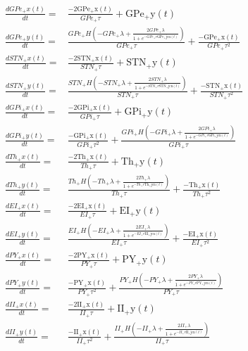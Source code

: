 \begin{align}
\frac{dGPe_{+}x(t)}{dt} =& \frac{ - 2 \mathrm{GPe_{+}x}\left( t \right)}{GPe_+\tau} + \mathrm{GPe_{+}y}\left( t \right) \\
\frac{dGPe_{+}y(t)}{dt} =& \frac{GPe_{+}H \left(  - GPe_+\lambda + \frac{2 GPe_+\lambda}{1 + e^{ - GPe_{+}r \mathrm{GPe_{+}jcn}\left( t \right)}} \right)}{GPe_+\tau} + \frac{ - \mathrm{GPe_{+}x}\left( t \right)}{GPe_+\tau^{2}} \\
\frac{dSTN_{+}x(t)}{dt} =& \frac{ - 2 \mathrm{STN_{+}x}\left( t \right)}{STN_+\tau} + \mathrm{STN_{+}y}\left( t \right) \\
\frac{dSTN_{+}y(t)}{dt} =& \frac{STN_{+}H \left(  - STN_+\lambda + \frac{2 STN_+\lambda}{1 + e^{ - STN_{+}r \mathrm{STN_{+}jcn}\left( t \right)}} \right)}{STN_+\tau} + \frac{ - \mathrm{STN_{+}x}\left( t \right)}{STN_+\tau^{2}} \\
\frac{dGPi_{+}x(t)}{dt} =& \frac{ - 2 \mathrm{GPi_{+}x}\left( t \right)}{GPi_+\tau} + \mathrm{GPi_{+}y}\left( t \right) \\
\frac{dGPi_{+}y(t)}{dt} =& \frac{ - \mathrm{GPi_{+}x}\left( t \right)}{GPi_+\tau^{2}} + \frac{GPi_{+}H \left(  - GPi_+\lambda + \frac{2 GPi_+\lambda}{1 + e^{ - GPi_{+}r \mathrm{GPi_{+}jcn}\left( t \right)}} \right)}{GPi_+\tau} \\
\frac{dTh_{+}x(t)}{dt} =& \frac{ - 2 \mathrm{Th_{+}x}\left( t \right)}{Th_+\tau} + \mathrm{Th_{+}y}\left( t \right) \\
\frac{dTh_{+}y(t)}{dt} =& \frac{Th_{+}H \left(  - Th_+\lambda + \frac{2 Th_+\lambda}{1 + e^{ - Th_{+}r \mathrm{Th_{+}jcn}\left( t \right)}} \right)}{Th_+\tau} + \frac{ - \mathrm{Th_{+}x}\left( t \right)}{Th_+\tau^{2}} \\
\frac{dEI_{+}x(t)}{dt} =& \frac{ - 2 \mathrm{EI_{+}x}\left( t \right)}{EI_+\tau} + \mathrm{EI_{+}y}\left( t \right) \\
\frac{dEI_{+}y(t)}{dt} =& \frac{EI_{+}H \left(  - EI_+\lambda + \frac{2 EI_+\lambda}{1 + e^{ - EI_{+}r \mathrm{EI_{+}jcn}\left( t \right)}} \right)}{EI_+\tau} + \frac{ - \mathrm{EI_{+}x}\left( t \right)}{EI_+\tau^{2}} \\
\frac{dPY_{+}x(t)}{dt} =& \frac{ - 2 \mathrm{PY_{+}x}\left( t \right)}{PY_+\tau} + \mathrm{PY_{+}y}\left( t \right) \\
\frac{dPY_{+}y(t)}{dt} =& \frac{ - \mathrm{PY_{+}x}\left( t \right)}{PY_+\tau^{2}} + \frac{PY_{+}H \left(  - PY_+\lambda + \frac{2 PY_+\lambda}{1 + e^{ - PY_{+}r \mathrm{PY_{+}jcn}\left( t \right)}} \right)}{PY_+\tau} \\
\frac{dII_{+}x(t)}{dt} =& \frac{ - 2 \mathrm{II_{+}x}\left( t \right)}{II_+\tau} + \mathrm{II_{+}y}\left( t \right) \\
\frac{dII_{+}y(t)}{dt} =& \frac{ - \mathrm{II_{+}x}\left( t \right)}{II_+\tau^{2}} + \frac{II_{+}H \left(  - II_+\lambda + \frac{2 II_+\lambda}{1 + e^{ - II_{+}r \mathrm{II_{+}jcn}\left( t \right)}} \right)}{II_+\tau}
\end{align}
